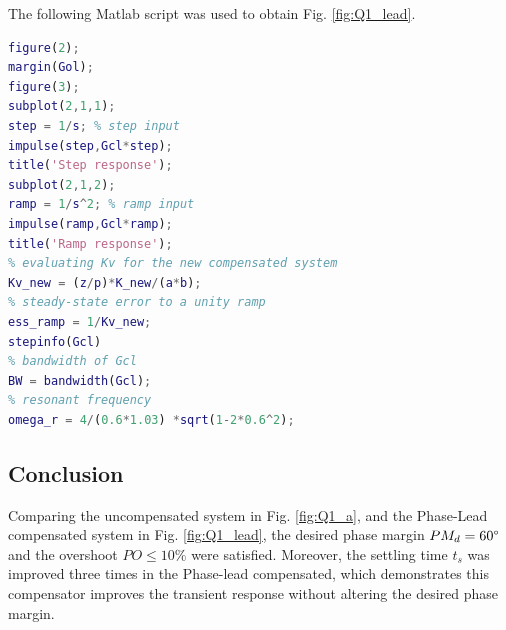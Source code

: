 \documentclass[11pt, a4paper]{article}
\begin{document}
\begin{table}[!ht]
	\centering
	\caption{Performance evaluation. }
	\label{tab:lead}
\end{table}

The following Matlab script was used to obtain Fig. \ref{fig:Q1_lead}.

\begin{lstlisting}[language=matlab, caption={}, label={}]
%% c) evaluating the system to unit step and unit ramp
figure(2);
margin(Gol);
figure(3);
subplot(2,1,1);
step = 1/s; % step input
impulse(step,Gcl*step); 
title('Step response');
subplot(2,1,2);
ramp = 1/s^2; % ramp input
impulse(ramp,Gcl*ramp);
title('Ramp response');
% evaluating Kv for the new compensated system
Kv_new = (z/p)*K_new/(a*b);
% steady-state error to a unity ramp
ess_ramp = 1/Kv_new;
stepinfo(Gcl)
% bandwidth of Gcl
BW = bandwidth(Gcl);
% resonant frequency
omega_r = 4/(0.6*1.03) *sqrt(1-2*0.6^2);
\end{lstlisting}


\subsection{Conclusion}
Comparing the uncompensated system in Fig. \ref{fig:Q1_a}, and the Phase-Lead compensated system in Fig. \ref{fig:Q1_lead}, the desired phase margin $PM_d=60\degree$ and the overshoot $PO\leq10 \%$ were satisfied. Moreover, the settling time $t_s$ was improved three times in the Phase-lead compensated, which demonstrates this compensator improves the transient response without altering the desired phase margin.
\end{document}
